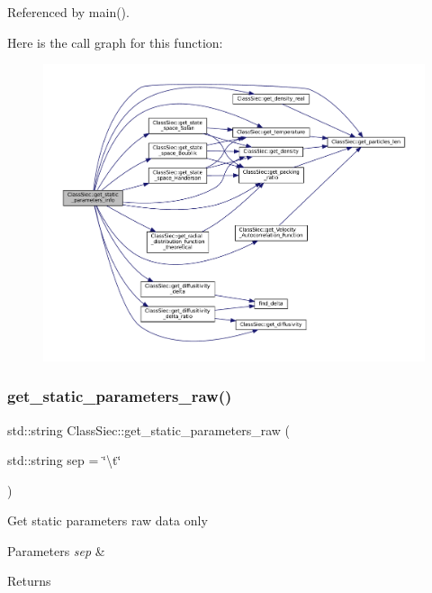 Referenced by main().

Here is the call graph for this function\+:
\nopagebreak
\begin{figure}[H]
\begin{center}
\leavevmode
\includegraphics[width=350pt]{classClassSiec_aaf3b24bc73d268f151acdff6351214e0_cgraph}
\end{center}
\end{figure}
\mbox{\label{classClassSiec_abed8d28e81524a99ab325569db15bb36}} 
\subsubsection{\texorpdfstring{get\+\_\+static\+\_\+parameters\+\_\+raw()}{get\_static\_parameters\_raw()}}
{\footnotesize\ttfamily std\+::string Class\+Siec\+::get\+\_\+static\+\_\+parameters\+\_\+raw (\begin{DoxyParamCaption}\item[{std\+::string}]{sep = {\ttfamily \char`\"{}\textbackslash{}t\char`\"{}} }\end{DoxyParamCaption})}

Get static parameters raw data only 
\begin{DoxyParams}{Parameters}
{\em sep} & \\
\hline
\end{DoxyParams}
\begin{DoxyReturn}{Returns}

\end{DoxyReturn}


